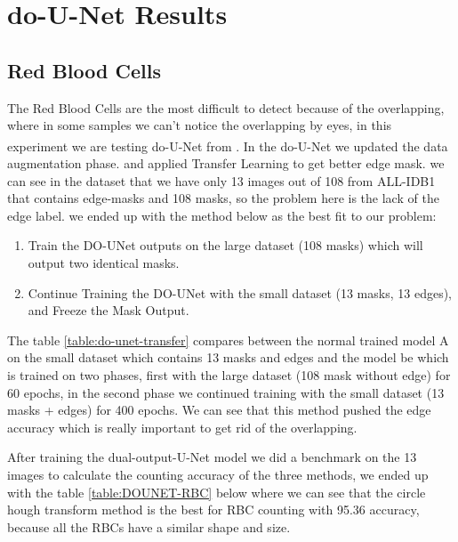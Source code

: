 \section{do-U-Net Results}
\subsection{Red Blood Cells}
\hspace{\parindent}
The Red Blood Cells are the most difficult to detect because of the overlapping, where in some samples we can't notice the overlapping by eyes, in this experiment we are testing do-U-Net from \textsuperscript{\cite{10.1007/978-3-030-44584-3_31}}.
In the do-U-Net we updated the data augmentation phase. and applied Transfer Learning to get better edge mask. we can see in the dataset that we have only 13 images out of 108 from ALL-IDB1 that contains edge-masks and 108 masks, so the problem here is the lack of the edge label. we ended up with the method below as the best fit to our problem:

\begin{enumerate}
    \item Train the DO-UNet outputs on the large dataset (108 masks) which will output two identical masks.
    \item Continue Training the DO-UNet with the small dataset (13 masks, 13 edges), and Freeze the Mask Output.
\end{enumerate}



The table \ref{table:do-unet-transfer} compares between the normal trained model A on the small dataset which contains 13 masks and edges and the model be which is trained on two phases, first with the large dataset (108 mask without edge) for 60 epochs, in the second phase we continued training with the small dataset (13 masks + edges) for 400 epochs.
We can see that this method pushed the edge accuracy which is really important to get rid of the overlapping.

After training the dual-output-U-Net model we did a benchmark on the 13 images to calculate the counting accuracy of the three methods, we ended up with the table \ref{table:DOUNET-RBC} below where we can see that the circle hough transform method is the best for RBC counting with 95.36 accuracy, because all the RBCs have a similar shape and size.



